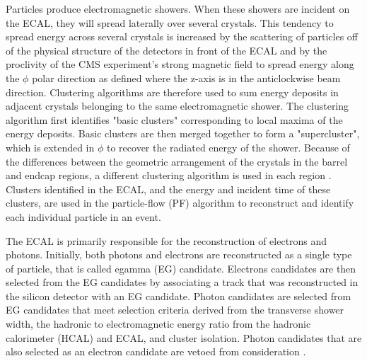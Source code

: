 Particles produce electromagnetic showers. When these showers are incident on the ECAL, they will spread laterally over several crystals. This tendency to spread energy across several crystals is increased by the scattering of particles off of the physical structure of the detectors in front of the ECAL and by the proclivity of the CMS experiment's strong magnetic field to spread energy along the $\phi$ polar direction as defined where the z-axis is in the anticlockwise beam direction. Clustering algorithms are therefore used to sum energy deposits in adjacent crystals belonging to the same electromagnetic shower. The clustering algorithm first identifies "basic clusters" corresponding to local maxima of the energy deposits. Basic clusters are then merged together to form a "supercluster", which is extended in $\phi$ to recover the radiated energy of the shower. Because of the differences between the geometric arrangement of the crystals in the barrel and endcap regions, a different clustering algorithm is used in each region \cite{CMS:2013lxn}. Clusters identified in the ECAL, and the energy and incident time of these clusters, are used in the particle-flow (PF) algorithm to reconstruct and identify each individual particle in an event.

The ECAL is primarily responsible for the reconstruction of electrons and photons. Initially, both photons and electrons are reconstructed as a single type of particle, that is called egamma (EG) candidate. Electrons candidates are then selected from the EG candidates by associating a track that was reconstructed in the silicon detector with an EG candidate. Photon candidates are selected from EG candidates that meet selection criteria derived from the transverse shower width, the hadronic to electromagnetic energy ratio from the hadronic calorimeter (HCAL) and ECAL, and cluster isolation. Photon candidates that are also selected as an electron candidate are vetoed from consideration \cite{CMS:2015myp}.


